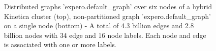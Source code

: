 \documentclass[preprint,3p,twocolumn]{elsarticle}
\begin{document}
\begin{figure}
\centering
    \caption{Distributed graphs 'expero.default\_graph' over six nodes of a hybrid Kinetica cluster (top), non-partitioned graph 'expero.default\_graph' on a single node (bottom) - A total of 4.3 billion edges and 2.8 billion nodes with 34 edge and 16 node labels. Each node and edge is associated with one or more labels.}
    \label{Figure:distributed}
\end{figure}
\end{document}
